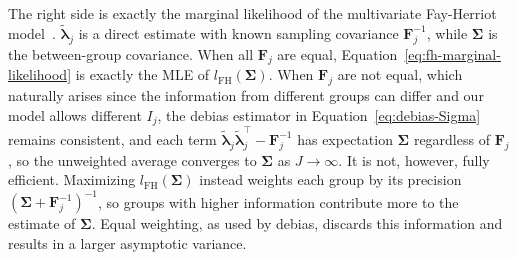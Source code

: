 The right side is exactly the marginal likelihood of the multivariate Fay-Herriot model~\citep{Herriot1979, Pfeffermann2011}. $\tilde{\bm{\lambda}}_j$ is a direct estimate with known sampling covariance $\mathbf{F}_j^{-1}$, while $\bm{\Sigma}$ is the between-group covariance. When all $\mathbf{F}_j$ are equal, Equation~\eqref{eq:fh-marginal-likelihood} is exactly the MLE of $l_{\text{FH}}(\bm{\Sigma})$. When $\mathbf{F}_j$ are not equal, which naturally arises since the information from different groups can differ and our model allows different $I_j$, the debias estimator in Equation~\eqref{eq:debias-Sigma} remains consistent, and each term $\tilde{\bm{\lambda}}_j\tilde{\bm{\lambda}}_j^{\top}-\mathbf{F}_j^{-1}$ has expectation $\bm{\Sigma}$ regardless of $\mathbf{F}_j$, so the unweighted average converges to $\bm{\Sigma}$ as $J\to\infty$. It is not, however, fully efficient. Maximizing $l_{\text{FH}}(\bm{\Sigma})$ instead weights each group by its precision $(\bm{\Sigma}+\mathbf{F}_j^{-1})^{-1}$, so groups with higher information contribute more to the estimate of $\bm{\Sigma}$. Equal weighting, as used by debias, discards this information and results in a larger asymptotic variance.

